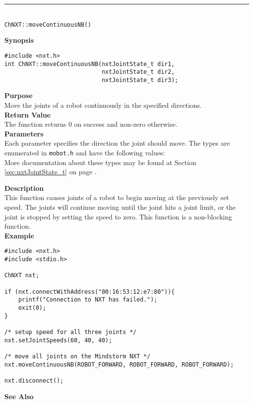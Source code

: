 \noindent
\vspace{5pt}
\rule{4.5in}{0.015in}\\
\noindent
{\LARGE \texttt{ChNXT::moveContinuousNB()} }\\


\noindent
{\bf Synopsis}
\vspace{-8pt}
\begin{verbatim}
#include <nxt.h>
int ChNXT::moveContinuousNB(nxtJointState_t dir1, 
                            nxtJointState_t dir2, 
                            nxtJointState_t dir3); 
\end{verbatim}

\noindent
{\bf Purpose}\\
Move the joints of a robot continuously in the specified directions.\\

\noindent
{\bf Return Value}\\
The function returns 0 on success and non-zero otherwise.\\

\noindent
{\bf Parameters}\\
Each parameter specifies the direction the joint should move. The types
are enumerated in \texttt{mobot.h} and have the following values:\\

\noindent
More documentation about these types may be found at Section
\ref{sec:nxtJointState_t} on page
\pageref{sec:nxtJointState_t}.

\noindent
{\bf Description}\\
This function causes joints of a robot to begin moving at the 
previously set speed. The joints will continue moving until the 
joint hits a joint limit, or the joint is stopped by setting the 
speed to zero. This function is a non-blocking function.\\

\noindent
{\bf Example}
\begin{verbatim}
#include <nxt.h> 
#include <stdio.h>

ChNXT nxt;

if (nxt.connectWithAddress("00:16:53:12:e7:80")){
    printf("Connection to NXT has failed.");
    exit(0);
}
 
/* setup speed for all three joints */
nxt.setJointSpeeds(60, 40, 40);

/* move all joints on the Mindstorm NXT */
nxt.moveContinuousNB(ROBOT_FORWARD, ROBOT_FORWARD, ROBOT_FORWARD);

nxt.disconnect();
\end{verbatim}

\noindent
{\bf See Also}\\

